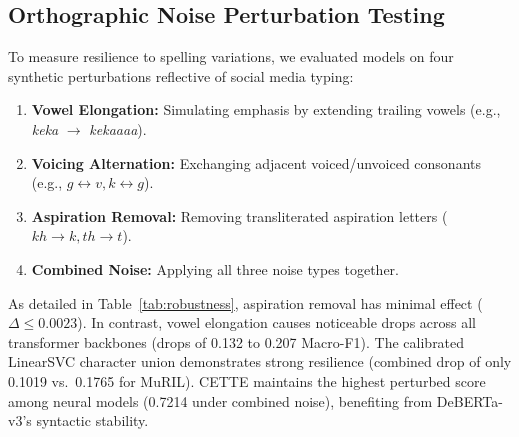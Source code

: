 \documentclass[10pt,conference]{IEEEtran}
\begin{document}
\subsection{Orthographic Noise Perturbation Testing}
To measure resilience to spelling variations, we evaluated models on four synthetic perturbations reflective of social media typing:
\begin{enumerate}
    \item \textbf{Vowel Elongation:} Simulating emphasis by extending trailing vowels (e.g., \textit{keka} $\rightarrow$ \textit{kekaaaa}).
    \item \textbf{Voicing Alternation:} Exchanging adjacent voiced/unvoiced consonants (e.g., $g \leftrightarrow v, k \leftrightarrow g$).
    \item \textbf{Aspiration Removal:} Removing transliterated aspiration letters ($kh \rightarrow k, th \rightarrow t$).
    \item \textbf{Combined Noise:} Applying all three noise types together.
\end{enumerate}

As detailed in Table~\ref{tab:robustness}, aspiration removal has minimal effect ($\Delta \le 0.0023$). In contrast, vowel elongation causes noticeable drops across all transformer backbones (drops of 0.132 to 0.207 Macro-F1). The calibrated LinearSVC character union demonstrates strong resilience (combined drop of only 0.1019 vs.\ 0.1765 for MuRIL). CETTE maintains the highest perturbed score among neural models (0.7214 under combined noise), benefiting from DeBERTa-v3's syntactic stability.
\end{document}
